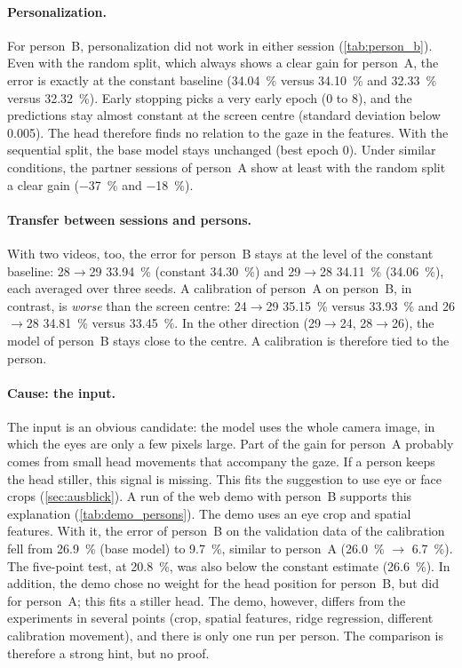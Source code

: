 \paragraph{Personalization.} For person~B, personalization did not work in
either session (\cref{tab:person_b}). Even with the random split, which always
shows a clear gain for person~A, the error is exactly at the constant baseline
(\SI{34.04}{\percent} versus \SI{34.10}{\percent} and \SI{32.33}{\percent}
versus \SI{32.32}{\percent}). Early stopping picks a very early epoch (0 to 8),
and the predictions stay almost constant at the screen centre (standard
deviation below \num{0.005}). The head therefore finds no relation to the gaze
in the features. With the sequential split, the base model stays unchanged
(best epoch 0). Under similar conditions, the partner sessions of person~A show
at least with the random split a clear gain ($-$\SI{37}{\percent} and
$-$\SI{18}{\percent}).

\paragraph{Transfer between sessions and persons.} With two videos, too, the
error for person~B stays at the level of the constant baseline: 28$\to$29
\SI{33.94}{\percent} (constant \SI{34.30}{\percent}) and 29$\to$28
\SI{34.11}{\percent} (\SI{34.06}{\percent}), each averaged over three seeds. A
calibration of person~A on person~B, in contrast, is \emph{worse} than the screen
centre: 24$\to$29 \SI{35.15}{\percent} versus \SI{33.93}{\percent} and
26$\to$28 \SI{34.81}{\percent} versus \SI{33.45}{\percent}. In the other
direction (29$\to$24, 28$\to$26), the model of person~B stays close to the
centre. A calibration is therefore tied to the person.

\paragraph{Cause: the input.} The input is an obvious candidate: the model uses the whole camera
image, in which the eyes are only a few pixels large. Part of the gain for
person~A probably comes from small head movements that accompany the gaze. If a
person keeps the head stiller, this signal is missing. This fits the suggestion
to use eye or face crops (\cref{sec:ausblick}). A run of the web demo with
person~B supports this explanation (\cref{tab:demo_persons}). The demo uses an
eye crop and spatial features. With it, the error of person~B on the validation
data of the calibration fell from \SI{26.9}{\percent} (base model) to
\SI{9.7}{\percent}, similar to person~A (\SI{26.0}{\percent}
$\rightarrow$ \SI{6.7}{\percent}). The five-point test, at
\SI{20.8}{\percent}, was also below the constant estimate
(\SI{26.6}{\percent}). In addition, the demo chose no weight for the head
position for person~B, but did for person~A; this fits a stiller head. The demo,
however, differs from the experiments in several points (crop, spatial
features, ridge regression, different calibration movement), and there is only
one run per person. The comparison is therefore a strong hint, but no proof.

